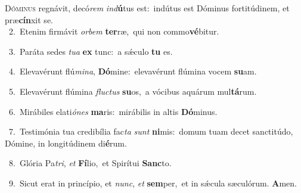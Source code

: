 \lettrine{\initial\textcolor{\initialcolor}{D}}{óminus} regnávit, decó\textit{rem} \textit{ind}\-\textbf{ú}tus est:~\star indútus est Dóminus fortitúdinem, et præ\-\textbf{cín}\-xit se.\\
{\numbfont\textcolor{\numbcolor}{~2.}}~Etenim firmávit \textit{or}\-\textit{bem} \textbf{ter}\-ræ,~\star qui non commo\-\textbf{vé}\-bitur.\par
{\numbfont\textcolor{\numbcolor}{~3.}}~Paráta sedes \textit{tu}\-\textit{a} \textbf{ex} tunc:~\star a sǽculo \textbf{tu} es.\par
{\numbfont\textcolor{\numbcolor}{~4.}}~Elevavérunt flú\-\textit{mi}\-\textit{na}, \textbf{Dó}\-mine:~\star elevavérunt flúmina vocem \textbf{su}\-am.\par
{\numbfont\textcolor{\numbcolor}{~5.}}~Elevavérunt flúmina \textit{fluc}\-\textit{tus} \textbf{su}\-os,~\star a vócibus aquárum mul\-\textbf{tá}\-rum.\par
{\numbfont\textcolor{\numbcolor}{~6.}}~Mirábiles elati\-\textit{ó}\-\textit{nes} \textbf{ma}\-ris:~\star mirábilis in altis \textbf{Dó}\-minus.\par
{\numbfont\textcolor{\numbcolor}{~7.}}~Testimónia tua credibília fac\textit{ta} \textit{sunt} \textbf{ni}\-mis:~\star domum tuam decet sanctitúdo, Dómine, in longitúdinem di\-\textbf{é}\-rum.\par
{\numbfont\textcolor{\numbcolor}{~8.}}~Glória Pa\-\textit{tri}\-, \textit{et} \textbf{Fí}\-lio,~\star et Spirítui \textbf{Sanc}\-to.\par
{\numbfont\textcolor{\numbcolor}{~9.}}~Sicut erat in princípio, et \textit{nunc}\-, \textit{et} \textbf{sem}\-per,~\star et in sǽcula sæculórum. \textbf{A}\-men.\par
